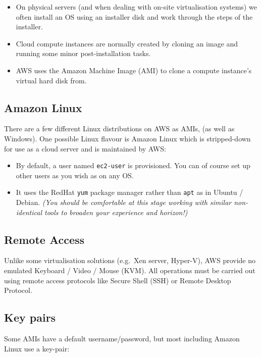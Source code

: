 \documentclass{pgnotes}
\begin{document}
\begin{itemize}
\item
  On physical servers (and when dealing with on-site virtualisation
  systems) we often install an OS using an installer disk and work
  through the steps of the installer.
\item
  Cloud compute instances are normally created by cloning an image and
  running some minor post-installation tasks.
\item
  AWS uses the Amazon Machine Image (AMI) to clone a compute instance's
  virtual hard disk from.
\end{itemize}

\subsection{Amazon Linux}\label{amazon-linux}

There are a few different Linux distributions on AWS as AMIs, (as well as Windows).
One possible Linux flavour is Amazon Linux which is stripped-down for use as a cloud server and is maintained by AWS:

\begin{itemize}
\item
  By default, a user named \texttt{ec2-user} is provisioned. You can of
  course set up other users as you wish as on any OS.
\item
  It uses the RedHat \texttt{yum} package manager rather than
  \texttt{apt} as in Ubuntu / Debian. \emph{(You should be comfortable
  at this stage working with similar non-identical tools to broaden your
  experience and horizon!)}
\end{itemize}

\subsection{Remote Access}\label{remote-access}

Unlike some virtualisation solutions (e.g.~Xen server, Hyper-V), AWS provide no emulated Keyboard / Video / Mouse (KVM).
All operations must be carried out using remote access protocols like Secure Shell (SSH) or Remote Desktop Protocol.

\subsection{Key pairs}
\label{sec:key-pairs}

Some AMIs have a default username/password, but most including Amazon
Linux use a key-pair:
\end{document}
